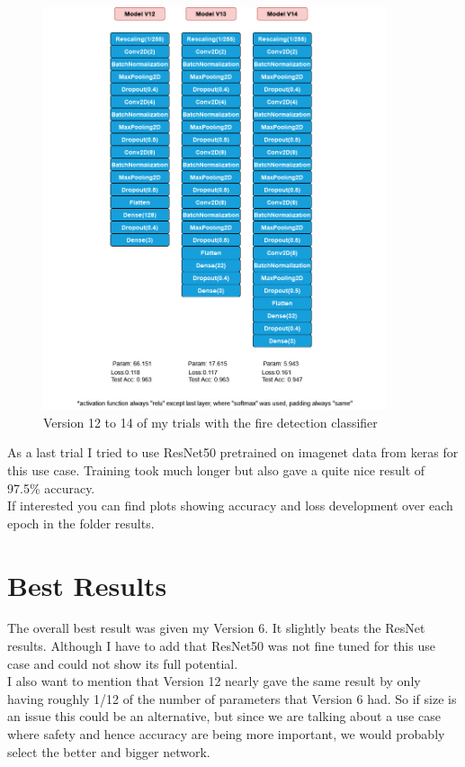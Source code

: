 \documentclass[]{article}
\begin{document}
\begin{figure}[H]
	\centering
	\includegraphics[width=0.9\textwidth]{"../visualizations/models/Model12-14_acc.jpg"}
	\caption{Version 12 to 14 of my trials with the fire detection classifier}
\end{figure}
As a last trial I tried to use ResNet50 pretrained on imagenet data from keras for this use case. Training took much longer but also gave a quite nice result of 97.5\% accuracy.\\
If interested you can find plots showing accuracy and loss development over each epoch in the folder results.
\section{Best Results}
The overall best result was given my Version 6. It slightly beats the ResNet results. Although I have to add that ResNet50 was not fine tuned for this use case and could not show its full potential.\\
I also want to mention that Version 12 nearly gave the same result by only having roughly 1/12 of the number of parameters that Version 6 had. So if size is an issue this could be an alternative, but since we are talking about a use case where safety and hence accuracy are being more important, we would probably select the better and bigger network.\\
\end{document}
